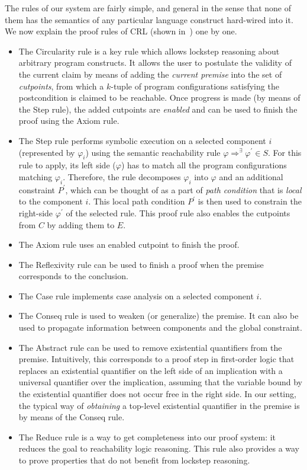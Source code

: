 The rules of our system are fairly simple, and general in the sense that none of them has the semantics of any particular language construct
hard-wired into it.
We now explain the proof rules of CRL (shown in~) one by one.
\begin{itemize}
  \item The Circularity rule is a key rule which allows lockstep reasoning about arbitrary program constructs.
        It allows the user to postulate the validity of the current claim by means of adding the \emph{current premise}
        into the set of \emph{cutpoints}, from which a $k$-tuple of program configurations satisfying the postcondition
        is claimed to be reachable. Once progress is made (by means of the Step rule), the added cutpoints are
        \emph{enabled} and can be used to finish the proof using the Axiom rule.
  \item The Step rule performs symbolic execution on a selected component $i$ (represented by $\varphi_i$)
        using the semantic reachability rule $\varphi \Rightarrow^\exists \varphi^\prime \in S$.
        For this rule to apply, its left side ($\varphi$) has to match all the program configurations matching $\varphi_i$.
        Therefore, the rule decomposes $\varphi_i$ into $\varphi$ and an additional constraint $P^\prime$,
        which can be thought of as a part of \emph{path condition} that is \emph{local} to the component $i$.
        This local path condition $P^\prime$ is then used to constrain the right-side $\varphi^\prime$ of the selected rule.
        This proof rule also enables the cutpoints from $C$ by adding them to $E$.
  \item The Axiom rule uses an enabled cutpoint to finish the proof.
  \item The Reflexivity rule can be used to finish a proof when the premise corresponds to the conclusion.
  \item The Case rule implements case analysis on a selected component $i$.
  \item The Conseq rule is used to weaken (or generalize) the premise. It can also be used
        to propagate information between components and the global constraint.
  \item The Abstract rule can be used to remove existential quantifiers from the premise.
        Intuitively, this corresponds to a proof step in first-order logic that replaces
        an existential quantifier on the left side of an implication
        with a universal quantifier over the implication, assuming that the variable
        bound by the existential quantifier does not occur free in the right side.
        In our setting, the typical way of \emph{obtaining} a top-level existential quantifier in the premise
        is by means of the Conseq rule.
  \item The Reduce rule is a way to get completeness into our proof system:
        it reduces the goal to reachability logic reasoning.
        This rule also provides a way to prove properties that do not benefit
        from lockstep reasoning.
\end{itemize}

